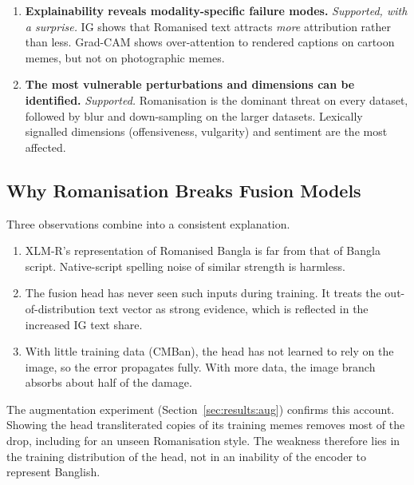 \begin{enumerate}
  \item \textbf{Explainability reveals modality-specific failure modes.} \emph{Supported, with a surprise.} IG shows
  that Romanised text attracts \emph{more} attribution rather than less. Grad-CAM shows over-attention to rendered
  captions on cartoon memes, but not on photographic memes.

  \item \textbf{The most vulnerable perturbations and dimensions can be identified.} \emph{Supported.} Romanisation
  is the dominant threat on every dataset, followed by blur and down-sampling on the larger datasets. Lexically signalled
  dimensions (offensiveness, vulgarity) and sentiment are the most affected.
\end{enumerate}

\subsection{Why Romanisation Breaks Fusion Models}
Three observations combine into a consistent explanation.
\begin{enumerate}
  \item XLM-R's representation of Romanised Bangla is far from that of Bangla script. Native-script spelling noise
  of similar strength is harmless.
  \item The fusion head has never seen such inputs during training. It treats the out-of-distribution text vector
  as strong evidence, which is reflected in the increased IG text share.
  \item With little training data (CMBan), the head has not learned to rely on the image, so the error propagates
  fully. With more data, the image branch absorbs about half of the damage.
\end{enumerate}
The augmentation experiment (Section~\ref{sec:results:aug}) confirms this account. Showing the head transliterated
copies of its training memes removes most of the drop, including for an unseen Romanisation style. The weakness
therefore lies in the training distribution of the head, not in an inability of the encoder to represent Banglish.

